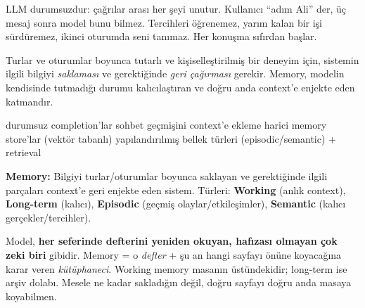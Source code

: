 

LLM durumsuzdur: çağrılar arası her şeyi unutur. Kullanıcı ``adım Ali'' der, üç
mesaj sonra model bunu bilmez. Tercihleri öğrenemez, yarım kalan bir işi
sürdüremez, ikinci oturumda seni tanımaz. Her konuşma sıfırdan başlar.


Turlar ve oturumlar boyunca tutarlı ve kişiselleştirilmiş bir deneyim için,
sistemin ilgili bilgiyi \emph{saklaması} ve gerektiğinde \emph{geri çağırması}
gerekir. Memory, modelin kendisinde tutmadığı durumu kalıcılaştıran ve doğru
anda context'e enjekte eden katmandır.

\begin{timeline}
 durumsuz completion'lar \tlsep {} sohbet geçmişini context'e ekleme \tlsep {} harici memory store'lar (vektör tabanlı) \tlsep {} yapılandırılmış bellek türleri (episodic/semantic) + retrieval
\end{timeline}

\begin{problembox}
\textbf{Memory:} Bilgiyi turlar/oturumlar boyunca saklayan ve gerektiğinde ilgili
parçaları context'e geri enjekte eden sistem. Türleri: \textbf{Working} (anlık
context), \textbf{Long-term} (kalıcı), \textbf{Episodic} (geçmiş olaylar/etkileşimler),
\textbf{Semantic} (kalıcı gerçekler/tercihler).
\end{problembox}

\begin{mentalbox}
Model, \textbf{her seferinde defterini yeniden okuyan, hafızası olmayan çok zeki
biri} gibidir. Memory = o \emph{defter} + şu an hangi sayfayı önüne koyacağına
karar veren \emph{kütüphaneci}. Working memory masanın üstündekidir; long-term
ise arşiv dolabı. Mesele ne kadar sakladığın değil, doğru sayfayı doğru anda
masaya koyabilmen.
\end{mentalbox}

